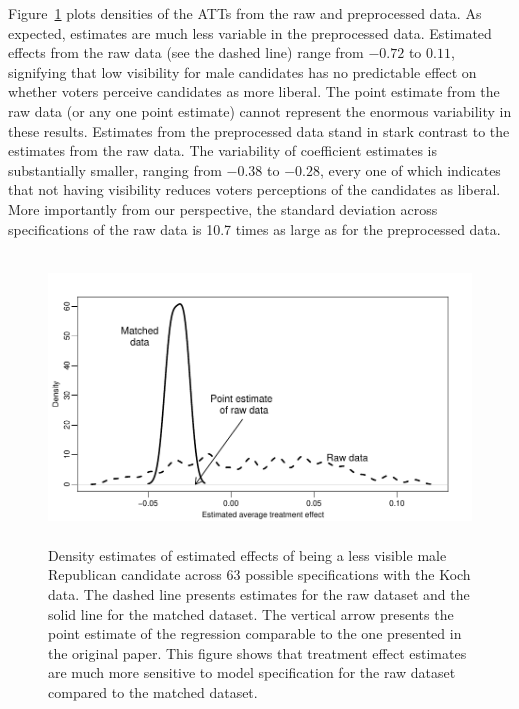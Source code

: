 \documentclass[11pt,titlepage]{article}
\begin{document}
Figure~\ref{fg:kochdens} plots densities of the ATTs from the raw and
preprocessed data.  As expected, estimates are much less variable in
the preprocessed data.  Estimated effects from the raw data (see the
dashed line) range from $-0.72$ to $0.11$, signifying that low
visibility for male candidates has no predictable effect on whether
voters perceive candidates as more liberal.  The point estimate from
the raw data (or any one point estimate) cannot represent the enormous
variability in these results.  Estimates from the preprocessed data
stand in stark contrast to the estimates from the raw data.  The
variability of coefficient estimates is substantially smaller, ranging
from $-0.38$ to $-0.28$, every one of which indicates that not having
visibility reduces voters perceptions of the candidates as liberal.
More importantly from our perspective, the standard deviation across
specifications of the raw data is 10.7 times as large as for the
preprocessed data.
\begin{figure}[t] 
 \begin{center}
   \includegraphics[height=3in,angle=0]{figs/kochdens.pdf}
 \end{center} 
 \vspace{-0.275in}
 \caption{Density estimates of estimated effects of
   being a less visible male Republican candidate across 63 possible
   specifications with the Koch data.  The dashed line presents
   estimates for the raw dataset and the solid line for the matched
   dataset.  The vertical arrow presents the point estimate of the
   regression comparable to the one presented in the original paper.
   This figure shows that treatment effect estimates are much more
   sensitive to model specification for the raw dataset compared to
   the matched dataset.}
 \label{fg:kochdens}
\end{figure}
\end{document}
